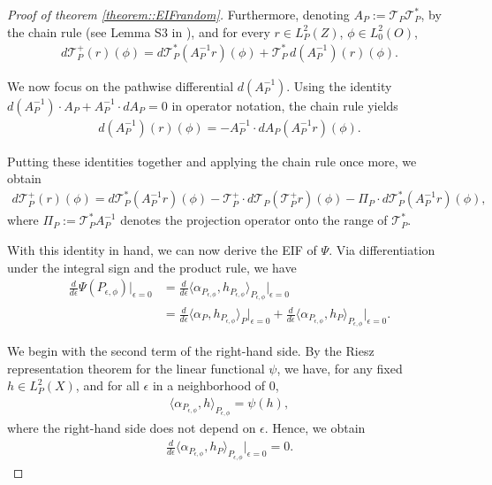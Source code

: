 \documentclass[11pt]{article}
\theoremstyle{plain}
\theoremstyle{definition}
\theoremstyle{remark}
\theoremstyle{definition}
\begin{document}
\begin{proof}[Proof of theorem \ref{theorem::EIFrandom}]
Furthermore, denoting \( A_P := \mathcal{T}_P \mathcal{T}_P^* \), by the chain rule (see Lemma S3 in \cite{luedtke2024simplifying}), and for every \( r \in L^2_P(Z) \), \( \phi \in L^2_0(O) \),
\begin{align*}
    d \mathcal{T}_P^+(r)(\phi) 
    = d \mathcal{T}_P^* ( A_P^{-1} r)(\phi) 
    + \mathcal{T}_P^*\, d(A_P^{-1})(r)(\phi).
\end{align*}

We now focus on the pathwise differential \( d(A_P^{-1}) \). Using the identity \( d(A_P^{-1}) \cdot A_P + A_P^{-1} \cdot dA_P = 0 \) in operator notation, the chain rule yields
\begin{align*}
    d(A_P^{-1})(r)(\phi) = - A_P^{-1} \cdot dA_P (A_P^{-1} r)(\phi).
\end{align*}

Putting these identities together and applying the chain rule once more, we obtain
\begin{align*}
    d \mathcal{T}_P^+(r)(\phi) 
    = d \mathcal{T}_P^* ( A_P^{-1} r)(\phi)
    - \mathcal{T}_P^+ \cdot d \mathcal{T}_P (\mathcal{T}_P^+ r)(\phi)
    - \Pi_P \cdot d \mathcal{T}_P^* (A_P^{-1} r)(\phi),
\end{align*}
where \( \Pi_P := \mathcal{T}_P^* A_P^{-1} \) denotes the projection operator onto the range of \( \mathcal{T}_P^* \).





With this identity in hand, we can now derive the EIF of \( \Psi \). Via differentiation under the integral sign and the product rule, we have
\begin{align*}
    \frac{d}{d \epsilon} \Psi(P_{\epsilon, \phi}) \big|_{\epsilon = 0} 
    &= \frac{d}{d \epsilon} \langle \alpha_{P_{\epsilon, \phi}}, h_{P_{\epsilon, \phi}} \rangle_{P_{\epsilon, \phi}} \big|_{\epsilon = 0} \\
    &= \frac{d}{d \epsilon} \langle \alpha_P, h_{P_{\epsilon, \phi}} \rangle_P \big|_{\epsilon = 0} 
    + \frac{d}{d \epsilon} \langle \alpha_{P_{\epsilon, \phi}}, h_P \rangle_{P_{\epsilon, \phi}} \big|_{\epsilon = 0}.
\end{align*}

We begin with the second term of the right-hand side. By the Riesz representation theorem for the linear functional \( \psi \), we have, for any fixed \( h \in L^2_P(X) \), and for all \( \epsilon \) in a neighborhood of 0,
\begin{align*}
    \langle \alpha_{P_{\epsilon, \phi}}, h \rangle_{P_{\epsilon, \phi}} = \psi(h),
\end{align*}
where the right-hand side does not depend on \( \epsilon \). Hence, we obtain
\begin{align*}
    \frac{d}{d \epsilon} \langle \alpha_{P_{\epsilon, \phi}}, h_P \rangle_{P_{\epsilon, \phi}} \bigg|_{\epsilon = 0} = 0.
\end{align*}





\end{proof}
\end{document}
